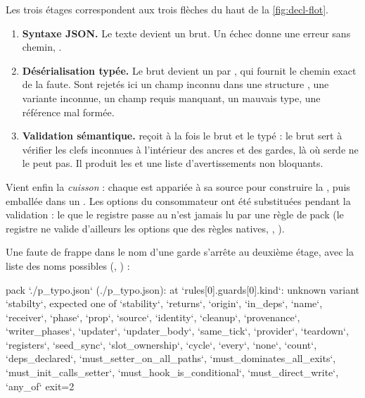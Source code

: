 
Les trois étages correspondent aux trois flèches du haut de la \cref{fig:decl-flot}.
\begin{enumerate}
  \item \textbf{Syntaxe JSON.} Le texte devient un  brut. Un échec donne une erreur sans chemin, \og {}\fg{}.
  \item \textbf{Désérialisation typée.} Le brut devient un  par , qui fournit le chemin exact de la faute. Sont rejetés ici un champ inconnu dans une structure , une variante inconnue, un champ requis manquant, un mauvais type, une référence  mal formée.
  \item \textbf{Validation sémantique.}  reçoit à la fois le brut et le typé : le brut sert à vérifier les clefs inconnues à l'intérieur des ancres et des gardes, là où serde ne le peut pas. Il produit les  et une liste d'avertissements non bloquants.
\end{enumerate}
Vient enfin la \emph{cuisson} : chaque  est appariée à sa  source pour construire la , puis emballée dans un . Les options du consommateur ont été substituées pendant la validation : le  que le registre passe au  n'est jamais lu par une règle de pack (le registre ne valide d'ailleurs les options que des règles natives, , ).

Une faute de frappe dans le nom d'une garde s'arrête au deuxième étage, avec la liste des noms possibles (, ) :

\begin{sortie}
[error] pack `./p_typo.json` (./p_typo.json): at `rules[0].guards[0].kind`: unknown variant `stabilty`, expected one of `stability`, `returns`, `origin`, `in_deps`, `name`, `receiver`, `phase`, `prop`, `source`, `identity`, `cleanup`, `provenance`, `writer_phases`, `updater`, `updater_body`, `same_tick`, `provider`, `teardown`, `registers`, `seed_sync`, `slot_ownership`, `cycle`, `every`, `none`, `count`, `deps_declared`, `must_setter_on_all_paths`, `must_dominates_all_exits`, `must_init_calls_setter`, `must_hook_is_conditional`, `must_direct_write`, `any_of`
exit=2
\end{sortie}

